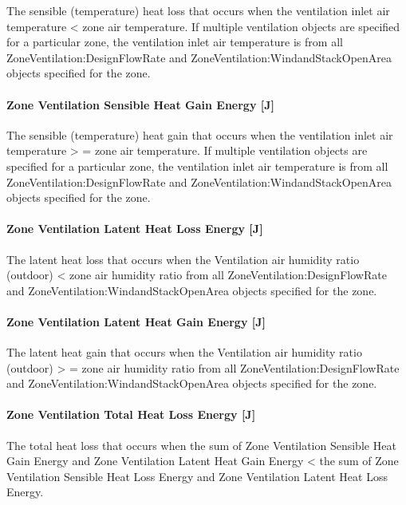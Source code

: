 The sensible (temperature) heat loss that occurs when the ventilation inlet air temperature \textless{} zone air temperature. If multiple ventilation objects are specified for a particular zone, the ventilation inlet air temperature is from all ZoneVentilation:DesignFlowRate and ZoneVentilation:WindandStackOpenArea objects specified for the zone.

\paragraph{Zone Ventilation Sensible Heat Gain Energy {[}J{]}}\label{zone-ventilation-sensible-heat-gain-energy-j}

The sensible (temperature) heat gain that occurs when the ventilation inlet air temperature \textgreater{} = zone air temperature. If multiple ventilation objects are specified for a particular zone, the ventilation inlet air temperature is from all ZoneVentilation:DesignFlowRate and ZoneVentilation:WindandStackOpenArea objects specified for the zone.

\paragraph{Zone Ventilation Latent Heat Loss Energy {[}J{]}}\label{zone-ventilation-latent-heat-loss-energy-j}

The latent heat loss that occurs when the Ventilation air humidity ratio (outdoor) \textless{} zone air humidity ratio from all ZoneVentilation:DesignFlowRate and ZoneVentilation:WindandStackOpenArea objects specified for the zone.

\paragraph{Zone Ventilation Latent Heat Gain Energy {[}J{]}}\label{zone-ventilation-latent-heat-gain-energy-j}

The latent heat gain that occurs when the Ventilation air humidity ratio (outdoor) \textgreater{} = zone air humidity ratio from all ZoneVentilation:DesignFlowRate and ZoneVentilation:WindandStackOpenArea objects specified for the zone.

\paragraph{Zone Ventilation Total Heat Loss Energy {[}J{]}}\label{zone-ventilation-total-heat-loss-energy-j}

The total heat loss that occurs when the sum of Zone Ventilation Sensible Heat Gain Energy and Zone Ventilation Latent Heat Gain Energy \textless{} the sum of Zone Ventilation Sensible Heat Loss Energy and Zone Ventilation Latent Heat Loss Energy.

